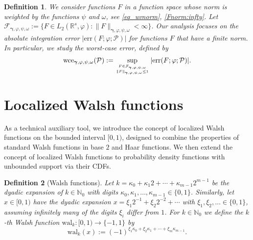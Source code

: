 \documentclass[namedate,webpdf,imanum]{ima-authoring-arxiv}%
\theoremstyle{thmstyletwo}%
\newtheorem{definition}{Definition}
\numberwithin{equation}{section}
\newcommand{\bsgamma}{\boldsymbol{\gamma}}
\newcommand{\cP}{\mathcal{P}}
\begin{document}
\begin{definition}
We consider functions $F$ in a function space whose norm is weighted by the functions $\psi$ and $\omega$, see \eqref{eq_uvnorm}, \eqref{Fnorm:infty}. Let $\mathcal{F}_{\bsgamma,\varphi,\psi,\omega} := \{F \in L_2(\mathbb{R}^s, \varphi): \|F\|_{\bsgamma, \varphi,\psi, \omega} < \infty\}$. %
Our analysis focuses on the absolute integration error $|\mathrm{err}(F; \varphi; \mathcal{P})|$ for functions $F$ that have a finite norm. %
In particular, we study the worst-case error, defined by 
\begin{equation}\label{def:wce}
{\rm wce}_{\bsgamma,\varphi,\psi,\omega}(\cP) := \sup_{F \in \mathcal{F}_{\bsgamma,\varphi,\psi,\omega} \atop \|F\|_{\bsgamma,\varphi,\psi,\omega}\le 1} |\mathrm{err}(F; \varphi; \mathcal{P})|.
\end{equation}
\end{definition}


\section{Localized Walsh functions}\label{sec:lwf}

As a technical auxiliary tool, we introduce the concept of localized Walsh functions on the bounded interval $[0,1)$, designed to combine the properties of standard Walsh functions in base $2$ and Haar functions. We then extend the concept of localized Walsh functions to probability density functions with unbounded support via their CDFs. 

\begin{definition}[Walsh functions] Let $k = \kappa_0 + \kappa_1 2 + \cdots + \kappa_{m-1} 2^{m-1}$ be the dyadic expansion of $k \in \mathbb{N}_0$ with digits $\kappa_0, \kappa_1, \ldots, \kappa_{m-1} \in \{0,1\}$. Similarly, let $x \in [0,1)$ have the dyadic expansion $x = \xi_1 2^{-1} + \xi_2 2^{-2} + \cdots$ with $\xi_1, \xi_2, \ldots \in \{0, 1\}$, assuming infinitely many of the digits $\xi_i$ differ from $1$. For $k \in \mathbb{N}_0$ we define the $k$-th Walsh function $\mathrm{wal}_k: [0,1) \to \{-1,1\}$ by
\begin{equation*}
\mathrm{wal}_k(x) := (-1)^{\xi_1 \kappa_0 + \xi_2 \kappa_1 + \cdots + \xi_{m} \kappa_{m-1}}.
\end{equation*}
\end{definition}
\end{document}
